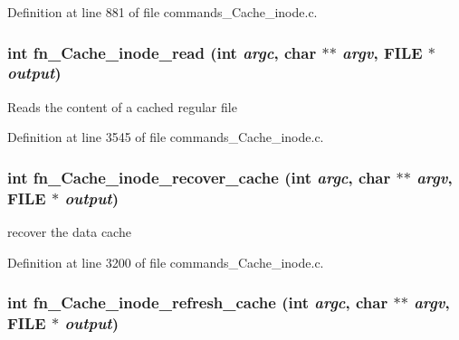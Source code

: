Definition at line 881 of file commands\_\-Cache\_\-inode.c.
\subsubsection[{fn\_\-Cache\_\-inode\_\-read}]{\setlength{\rightskip}{0pt plus 5cm}int fn\_\-Cache\_\-inode\_\-read (int {\em argc}, \/  char $\ast$$\ast$ {\em argv}, \/  FILE $\ast$ {\em output})}\label{commands__Cache__inode_8c_83f4bb6a3477931a870a2c45d5e1aa28}


Reads the content of a cached regular file 

Definition at line 3545 of file commands\_\-Cache\_\-inode.c.
\subsubsection[{fn\_\-Cache\_\-inode\_\-recover\_\-cache}]{\setlength{\rightskip}{0pt plus 5cm}int fn\_\-Cache\_\-inode\_\-recover\_\-cache (int {\em argc}, \/  char $\ast$$\ast$ {\em argv}, \/  FILE $\ast$ {\em output})}\label{commands__Cache__inode_8c_88f63b3c17722d4912113b8ecf0b247b}


recover the data cache 

Definition at line 3200 of file commands\_\-Cache\_\-inode.c.
\subsubsection[{fn\_\-Cache\_\-inode\_\-refresh\_\-cache}]{\setlength{\rightskip}{0pt plus 5cm}int fn\_\-Cache\_\-inode\_\-refresh\_\-cache (int {\em argc}, \/  char $\ast$$\ast$ {\em argv}, \/  FILE $\ast$ {\em output})}\label{commands__Cache__inode_8c_006ca27f7fd03ab4245e4a5b28fe4784}



